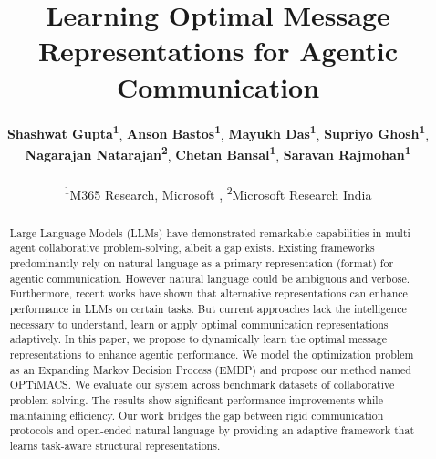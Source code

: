 \documentclass[11pt]{article}
\title{Learning Optimal Message Representations for Agentic Communication}
\author{
 \textbf{Shashwat Gupta\textsuperscript{1}},
 \textbf{Anson Bastos\textsuperscript{1}},
 \textbf{Mayukh Das\textsuperscript{1}},
 \textbf{Supriyo Ghosh\textsuperscript{1}},
 \\
 \textbf{Nagarajan Natarajan\textsuperscript{2}},
 \textbf{Chetan Bansal\textsuperscript{1}},
 \textbf{Saravan Rajmohan\textsuperscript{1}}
\\
\\
 \textsuperscript{1}M365 Research, Microsoft ,
 \textsuperscript{2}Microsoft Research India
}
\newcommand{\method}{OPTiMACS\xspace}
\begin{document}
\maketitle

\begin{abstract}
Large Language Models (LLMs) have demonstrated remarkable capabilities in multi-agent collaborative problem-solving, albeit a gap exists. 
Existing frameworks predominantly rely on natural language as a primary representation (format) for agentic communication. However natural language could be ambiguous and verbose. 
Furthermore, recent works have shown that alternative representations can enhance performance in LLMs on certain tasks.
But current approaches lack the intelligence necessary to understand, learn or apply optimal communication representations adaptively. 
In this paper, we propose to dynamically learn the optimal message representations to enhance agentic performance.
We model the optimization problem as an Expanding Markov Decision Process (EMDP) and propose our method named \method.
We evaluate our system across benchmark datasets of collaborative problem-solving.
The results show significant performance improvements while maintaining efficiency.
Our work bridges the gap between rigid communication protocols and open-ended natural language by providing an adaptive framework that learns task-aware structural representations.


\end{abstract}
\end{document}
